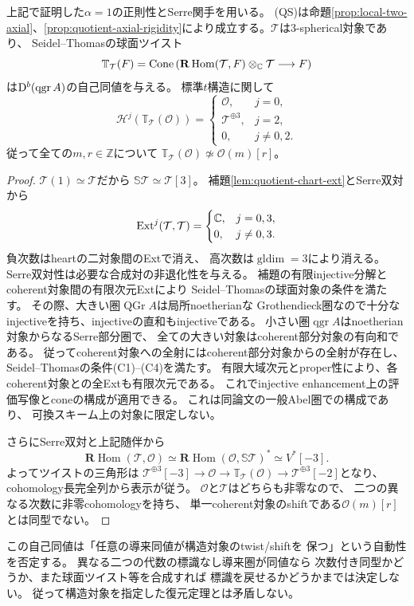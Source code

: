 \begin{theorem}
\label{thm:quotient-spherical-counterexample}
上記で証明した$\alpha=1$の正則性とSerre関手を用いる。
(QS)は命題\ref{prop:local-two-axial}、\ref{prop:quotient-axial-rigidity}により成立する。$\mathcal T$は3-spherical対象であり、
Seidel--Thomasの球面ツイスト
\cite[Definition~2.14, Proposition~2.10]{SeidelThomas}
\[
 \mathbb T_{\mathcal T}(F)=
 \operatorname{Cone}\left(
 \mathbf R\operatorname{Hom}(\mathcal T,F)
    \otimes_\mathbb C\mathcal T\longrightarrow F
 \right)
\]
は$\mathrm D^b(\operatorname{qgr}A)$の自己同値を与える。
標準$t$構造に関して
\[
 \mathcal H^j(\mathbb T_{\mathcal T}(\mathcal O))=
 \begin{cases}
 \mathcal O,&j=0,\\
 \mathcal T^{\oplus3},&j=2,\\
 0,&j\ne0,2.
 \end{cases}
\]
従って全ての$m,r\in\mathbb Z$について
$\mathbb T_{\mathcal T}(\mathcal O)\not\simeq\mathcal O(m)[r]$。
\end{theorem}
\begin{proof}
$\mathcal T(1)\simeq\mathcal T$だから
$\mathbb S\mathcal T\simeq\mathcal T[3]$。
補題\ref{lem:quotient-chart-ext}とSerre双対から
\[
 \operatorname{Ext}^j(\mathcal T,\mathcal T)=
 \begin{cases}\mathbb C,&j=0,3,\\0,&j\ne0,3.\end{cases}
\]
負次数はheartの二対象間のExtで消え、
高次数は$\operatorname{gldim}=3$により消える。
Serre双対性は必要な合成対の非退化性を与える。
補題の有限injective分解と
coherent対象間の有限次元Extにより
Seidel--Thomasの球面対象の条件を満たす。
その際、大きい圏$\operatorname{QGr}A$は局所noetherianな
Grothendieck圏なので十分なinjectiveを持ち、injectiveの直和もinjectiveである。
小さい圏$\operatorname{qgr}A$はnoetherian対象からなるSerre部分圏で、
全ての大きい対象はcoherent部分対象の有向和である。
従ってcoherent対象への全射にはcoherent部分対象からの全射が存在し、
Seidel--Thomasの条件(C1)--(C4)を満たす。
有限大域次元とproper性により、各coherent対象との全Extも有限次元である。
これでinjective enhancement上の評価写像とconeの構成が適用できる。
これは同論文の一般Abel圏での構成であり、
可換スキーム上の対象に限定しない。

さらにSerre双対と上記随伴から
\[
 \mathbf R\operatorname{Hom}(\mathcal T,\mathcal O)
  \simeq
  \mathbf R\operatorname{Hom}
     (\mathcal O,\mathbb S\mathcal T)^*
  \simeq V^*[-3].
\]
よってツイストの三角形は
$\mathcal T^{\oplus3}[-3]\to\mathcal O
\to\mathbb T_{\mathcal T}(\mathcal O)
\to\mathcal T^{\oplus3}[-2]$となり、
cohomology長完全列から表示が従う。
$\mathcal O$と$\mathcal T$はどちらも非零なので、
二つの異なる次数に非零cohomologyを持ち、
単一coherent対象のshiftである$\mathcal O(m)[r]$とは同型でない。
\end{proof}
\begin{remark}[標識なし復元とは異なる]
\label{rem:quotient-unmarked-reconstruction}
この自己同値は「任意の導来同値が構造対象のtwist/shiftを
保つ」という自動性を否定する。
異なる二つの代数の標識なし導来圏が同値なら
次数付き同型かどうか、また球面ツイスト等を合成すれば
標識を戻せるかどうかまでは決定しない。
従って構造対象を指定した復元定理とは矛盾しない。
\end{remark}
